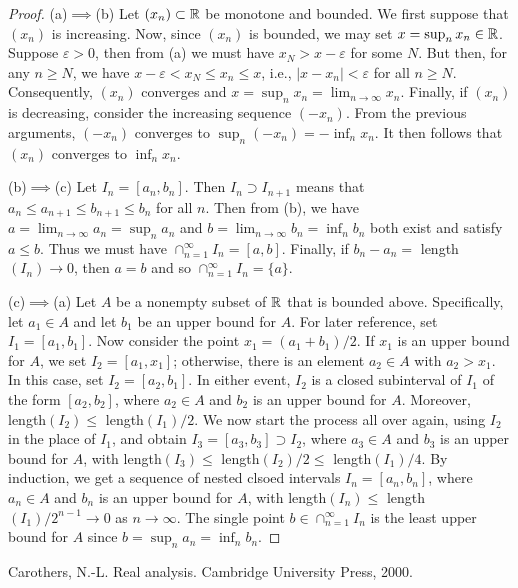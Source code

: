 \documentclass[11pt,a4paper]{article}
\begin{document}
\begin{proof}
    (a)$\implies$(b) Let $(x_n)\subset \mathbb{R}$ be monotone and bounded. We first suppose that $(x_n)$ is increasing. Now, since $(x_n)$ is bounded, we may set $x = \sup_n x_n\in \mathbb{R}$. Suppose $\varepsilon>0$, then from (a) we must have $x_N>x-\varepsilon$ for some $N$. But then, for any $n\ge N$, we have $x-\varepsilon<x_N\le x_n\le x$, i.e., $|x-x_n|<\varepsilon$ for all $n\ge N$. Consequently, $(x_n)$ converges and $x = \sup_n x_n = \lim_{n\rightarrow \infty} x_n$. Finally, if $(x_n)$ is decreasing, consider the increasing sequence $(-x_n)$. From the previous arguments, $(-x_n)$ converges to $\sup_n(-x_n) = -\inf_n x_n$. It then follows that $(x_n)$ converges to $\inf_n x_n$.

    \noindent(b)$\implies$(c) Let $I_n = [a_n,b_n]$. Then $I_n\supset I_{n+1}$ means that $a_n\le a_{n+1}\le b_{n+1}\le b_n$ for all $n$. Then from (b), we have $a=\lim_{n\rightarrow \infty} a_n = \sup_n a_n$ and $b=\lim_{n\rightarrow \infty} b_n = \inf_n b_n$ both exist and satisfy $a\le b$. Thus we must have $\cap_{n=1}^\infty I_n = [a,b]$. Finally, if $b_n-a_n =$ length$(I_n)\rightarrow 0$, then $a = b$ and so $\cap_{n=1}^\infty I_n = \{a\}$.
    
    \noindent(c)$\implies$(a) Let $A$ be a nonempty subset of $\mathbb{R}$ that is bounded above. Specifically, let $a_1\in A$ and let $b_1$ be an upper bound for $A$. For later reference, set $I_1 = [a_1,b_1]$. Now consider the point $x_1 = (a_1+b_1)/2$. If $x_1$ is an upper bound for $A$, we set $I_2 = [a_1,x_1]$; otherwise, there is an element $a_2\in A$ with $a_2>x_1$. In this case, set $I_2 = [a_2,b_1]$. In either event, $I_2$ is a closed subinterval of $I_1$ of the form $[a_2,b_2]$, where $a_2\in A$ and $b_2$ is an upper bound for $A$. Moreover, length$(I_2)\le$ length$(I_1)/2$. We now start the process all over again, using $I_2$ in the place of $I_1$, and obtain $I_3 = [a_3,b_3]\supset I_2$, where $a_3\in A$ and $b_3$ is an upper bound for $A$, with length$(I_3)\le$ length$(I_2)/2\le$ length$(I_1)/4$. By induction, we get a sequence of nested clsoed intervals $I_n = [a_n,b_n]$, where $a_n\in A$ and $b_n$ is an upper bound for $A$, with length$(I_n)\le$ length$(I_1)/2^{n-1}\rightarrow 0$ as $n\rightarrow \infty$. The single point $b\in \cap_{n=1}^\infty I_n$ is the least upper bound for $A$ since $b = \sup_n a_n = \inf_n b_n$. 
\end{proof}

\begin{thebibliography}{9}
    Carothers, N.-L. Real analysis. Cambridge University Press, 2000.
\end{thebibliography}
        
\end{document}
